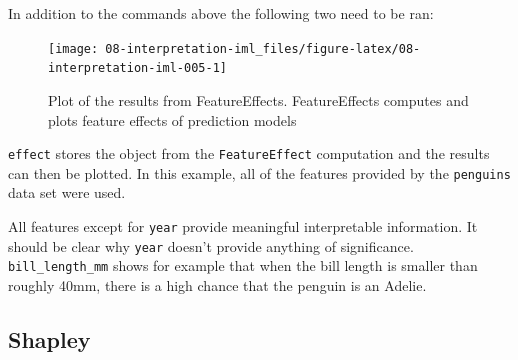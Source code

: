 \documentclass[
]{scrbook}
\newenvironment{Shaded}{\begin{snugshade}}{\end{snugshade}}
\newcommand{\AttributeTok}[1]{\textcolor[rgb]{0.77,0.63,0.00}{#1}}
\newcommand{\DecValTok}[1]{\textcolor[rgb]{0.00,0.00,0.81}{#1}}
\newcommand{\FunctionTok}[1]{\textcolor[rgb]{0.00,0.00,0.00}{#1}}
\newcommand{\NormalTok}[1]{#1}
\newcommand{\OtherTok}[1]{\textcolor[rgb]{0.56,0.35,0.01}{#1}}
\newcommand{\SpecialCharTok}[1]{\textcolor[rgb]{0.00,0.00,0.00}{#1}}
\newcommand{\StringTok}[1]{\textcolor[rgb]{0.31,0.60,0.02}{#1}}
\renewenvironment{Shaded} {\begin{snugshade}\small} {\end{snugshade}}
\begin{document}
In addition to the commands above the following two need to be ran:

\begin{Shaded}
\end{Shaded}

\begin{figure}

{\centering \texttt{[image: 08-interpretation-iml\_files/figure-latex/08-interpretation-iml-005-1]} 

}

\caption{Plot of the results from FeatureEffects. FeatureEffects computes and plots feature effects of prediction models}\label{fig:08-interpretation-iml-005}
\end{figure}

\texttt{effect} stores the object from the \texttt{FeatureEffect} computation and the results can then be plotted. In this example, all of the features provided by the \texttt{penguins} data set were used.

All features except for \texttt{year} provide meaningful interpretable information. It should be clear why \texttt{year} doesn't provide anything of significance. \texttt{bill\_length\_mm} shows for example that when the bill length is smaller than roughly 40mm, there is a high chance that the penguin is an Adelie.

\hypertarget{shapley}{%
\subsection{Shapley}\label{shapley}}

\begin{Shaded}
\end{Shaded}
\end{document}
